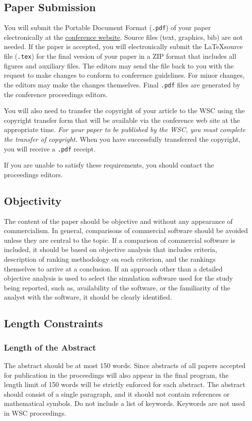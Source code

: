\documentclass{article}
\begin{document}
\subsection{Paper Submission}
You will submit the Portable Document Format ({\tt .pdf}) of your paper electronically at the \href{http://www.wintersim.org}{conference website}. Source files (text, graphics, bib) are not needed. If the paper is accepted, you will electronically submit the \LaTeX source file ({\tt .tex}) for the final version of your paper in a ZIP format that includes all figures and auxiliary files.
The editors may send the file back to you with the request to make changes to conform to conference guidelines. For minor changes, the editors may make the changes themselves. Final {\tt .pdf} files are generated by the conference proceedings editors.

You will also need to transfer the copyright of your article to the WSC using the copyright transfer form that will be available via the conference web site at the appropriate time. {\em For your paper to be published by the WSC, you must complete the transfer of copyright.}
When you have successfully transferred the copyright, you will receive a {\tt .pdf} receipt.

If you are unable to satisfy these requirements, you should contact the proceedings editors.

\subsection{Objectivity}
The content of the paper should be objective and without any appearance of commercialism. In general, comparisons of commercial software should be avoided unless they are central to the topic. If a comparison of commercial software is included, it should be based on objective analysis that includes criteria, description of ranking methodology on each criterion, and the rankings themselves to arrive at a conclusion. If an approach other than a detailed objective analysis is used to select the simulation software used for the study being reported, such as, availability of the software, or the familiarity of the analyst with the software, it should be clearly identified.

\subsection{Length Constraints}

\subsubsection{Length of the Abstract}
The abstract should be at most 150 words. Since abstracts of all papers accepted for publication in the proceedings will also appear in the final program, the length limit of 150 words will be strictly enforced for each abstract. The abstract should consist of a single paragraph, and it should not contain references or mathematical symbols. Do not include a list of keywords. Keywords are not used in WSC proceedings.
\end{document}
